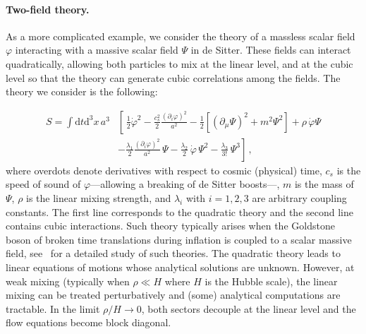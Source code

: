 \documentclass[11pt]{article}
\numberwithin{equation}{section} %
\def \d {\mathrm{d}}
\begin{document}
\paragraph{Two-field theory.} As a more complicated example, we consider the theory of a massless scalar field $\varphi$ interacting with a massive scalar field $\Psi$ in de Sitter. These fields can interact quadratically, allowing both particles to mix at the linear level, and at the cubic level so that the theory can generate cubic correlations among the fields. The theory we consider is the following:

\begin{equation}
\label{eq: phi-psi Lagrangian}
    \begin{aligned}
    S = \int \d t\d^3x\, a^3&\left[\,\frac{1}{2}\dot{\varphi}^2 - \frac{c_s^2}{2}\frac{(\partial_i \varphi)^2}{a^2} - \frac{1}{2}\left[(\partial_\mu \Psi)^2 + m^2\Psi^2\right] + \rho\, \dot{\varphi}\Psi \right.\\
    &\left.- \frac{\lambda_1}{2} \frac{(\partial_i \varphi)^2}{a^2}\,\Psi - \frac{\lambda_2}{2}\, \dot{\varphi} \,\Psi^2 - \frac{\lambda_3}{3!}\, \Psi^3 \right]\,,
    \end{aligned}
\end{equation}
where overdots denote derivatives with respect to cosmic (physical) time, $c_s$ is the speed of sound of $\varphi$---allowing a breaking of de Sitter boosts---, $m$ is the mass of $\Psi$, $\rho$ is the linear mixing strength, and $\lambda_i$ with $i=1, 2, 3$ are arbitrary coupling constants. The first line corresponds to the quadratic theory and the second line contains cubic interactions. Such theory typically arises when the Goldstone boson of broken time translations during inflation is coupled to a scalar massive field, see~\cite{Pinol:2023oux} for a detailed study of such theories. The quadratic theory leads to linear equations of motions whose analytical solutions are unknown. However, at weak mixing (typically when $\rho \ll H$ where $H$ is the Hubble scale), the linear mixing can be treated perturbatively and (some) analytical computations are tractable. In the limit $\rho/H \rightarrow 0$, both sectors decouple at the linear level and the flow equations become block diagonal. 
\end{document}
